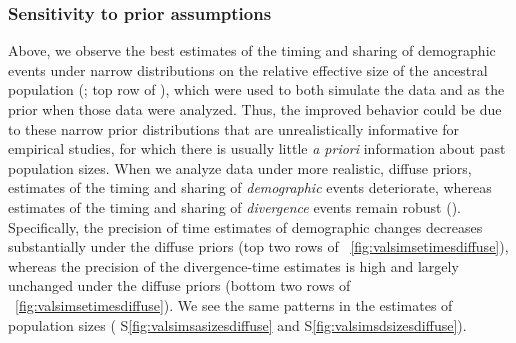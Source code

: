\subsubsection{Sensitivity to prior assumptions}

Above, we observe the best estimates of the timing and sharing of demographic
events under narrow distributions on the relative effective size of the
ancestral population
(\vsimfourinc; top row of \figs
{}),
which were used to both simulate the data and as the prior
when those data were analyzed.
Thus, the improved behavior could be due to these narrow prior distributions that
are unrealistically informative for empirical studies, for which there is
usually little \emph{a priori} information about past population sizes.
When we analyze data under more realistic, diffuse priors, estimates of the
timing and sharing of \emph{demographic} events deteriorate,
whereas estimates of the timing and sharing of \emph{divergence} events remain
robust
(\figs {}).
Specifically, the precision of time estimates of demographic changes decreases
substantially under the diffuse priors
(top two rows of \fig{}~\ref{fig:valsimsetimesdiffuse}),
whereas the precision of the divergence-time estimates
is high and largely unchanged under the diffuse priors
(bottom two rows of \fig{}~\ref{fig:valsimsetimesdiffuse}).
We see the same patterns in the estimates of population sizes
(\figs
S\ref{fig:valsimsasizesdiffuse}
and
S\ref{fig:valsimsdsizesdiffuse}).

